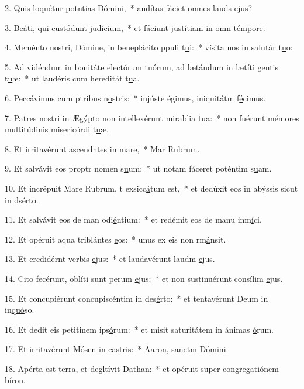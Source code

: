 2. Quis loquétur potntias D\uline{ó}mini,~* audítas fáciet omnes lauds \uline{e}jus?\par 
3. Beáti, qui custódunt jud\uline{í}cium,~* et fáciunt justítiam in omn t\uline{é}mpore.\par 
4. Meménto nostri, Dómine, in beneplácito ppuli t\uline{u}i:~* vísita nos in salutár t\uline{u}o:\par 
5. Ad vidéndum in bonitáte electórum tuórum, ad lætándum in lætíti gentis t\uline{u}æ:~* ut laudéris cum hereditát t\uline{u}a.\par 
6. Peccávimus cum ptribus n\uline{o}stris:~* injúste égimus, iniquitátm f\uline{é}cimus.\par 
7. Patres nostri in Ægýpto non intellexérunt mirablia t\uline{u}a:~* non fuérunt mémores multitúdinis misericórdi t\uline{u}æ.\par 
8. Et irritavérunt ascendntes in m\uline{a}re,~* Mar R\uline{u}brum.\par 
9. Et salvávit eos proptr nomen s\uline{u}um:~* ut notam fáceret poténtim s\uline{u}am.\par 
10. Et incrépuit Mare Rubrum, t exsicc\uline{á}tum est,~* et dedúxit eos in abýssis sicut in ds\uline{é}rto.\par 
11. Et salvávit eos de man odi\uline{é}ntium:~* et redémit eos de manu inm\uline{í}ci.\par 
12. Et opéruit aqua triblántes \uline{e}os:~* unus ex eis non rm\uline{á}nsit.\par 
13. Et credidérnt verbis \uline{e}jus:~* et laudavérunt laudm \uline{e}jus.\par 
14. Cito fecérunt, oblíti sunt perum \uline{e}jus:~* et non sustinuérunt consílim \uline{e}jus.\par 
15. Et concupiérunt concupiscéntim in des\uline{é}rto:~* et tentavérunt Deum in in\uline{quó}so.\par 
16. Et dedit eis petitinem ips\uline{ó}rum:~* et misit saturitátem in ánimas \uline{ó}rum.\par 
17. Et irritavérunt Mósen in c\uline{a}stris:~* Aaron, sanctm D\uline{ó}mini.\par 
18. Apérta est terra, et degltívit D\uline{a}than:~* et opéruit super congregatiónem b\uline{í}ron.\par 
